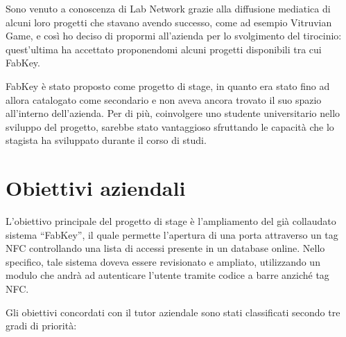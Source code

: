 

\medskip

Sono venuto a conoscenza di Lab Network grazie alla diffusione mediatica di alcuni loro progetti che stavano avendo successo, come ad esempio Vitruvian Game, e così ho deciso di propormi all'azienda per lo svolgimento del tirocinio: quest'ultima ha accettato proponendomi alcuni progetti disponibili tra cui FabKey.


\medskip

FabKey è stato proposto come progetto di stage, in quanto era stato fino ad allora catalogato come secondario e non aveva ancora trovato il suo spazio all'interno dell'azienda. Per di più, coinvolgere uno studente universitario nello sviluppo del progetto, sarebbe stato vantaggioso sfruttando le capacità che lo stagista ha sviluppato durante il corso di studi.

\section{Obiettivi aziendali}
L'obiettivo principale del progetto di stage è l'ampliamento del già collaudato sistema ``FabKey'', il quale permette l'apertura di una porta attraverso un tag NFC controllando una lista di accessi presente in un database online. Nello specifico, tale sistema doveva essere revisionato e ampliato, utilizzando un modulo che andrà ad autenticare l'utente tramite codice a barre anziché tag NFC.

Gli obiettivi concordati con il tutor aziendale sono stati classificati secondo tre gradi di priorità:

